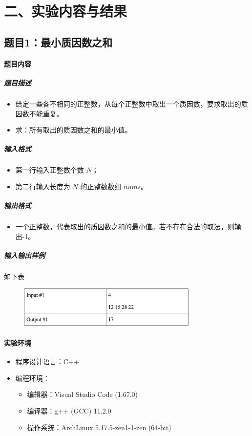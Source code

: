 \documentclass[12pt,a4paper]{ctexart}
\begin{document}
\vspace{5pt}

\section*{二、实验内容与结果}
\subsection*{题目1：最小质因数之和}
\paragraph{题目内容}
\subparagraph{题目描述}
\begin{itemize}
    \item 给定一些各不相同的正整数，从每个正整数中取出一个质因数，要求取出的质因数不能重复。
    \item 求：所有取出的质因数之和的最小值。
\end{itemize}


\subparagraph{输入格式}
    \begin{itemize}
        \item 第一行输入正整数个数 $N$；
        \item 第二行输入长度为 $N$ 的正整数数组 $nums$。
    \end{itemize}
\subparagraph{输出格式}
    \begin{itemize}
        \item 一个正整数，代表取出的质因数之和的最小值。若不存在合法的取法，则输出-1。
    \end{itemize}

\subparagraph{输入输出样例}
如下表
    \begin{figure}[h]
        \centering
        \includegraphics[width=0.80\textwidth]{q1_iodata.png}
    \end{figure}

\vspace{5pt}

\paragraph{实验环境}
\begin{itemize}
    \item 程序设计语言：C++
    \item 编程环境：
    \begin{itemize}
        \item 编辑器：Visual Studio Code (1.67.0)
        \item 编译器：g++ (GCC) 11.2.0
        \item 操作系统：ArchLinux 5.17.5-zen1-1-zen (64-bit)
    \end{itemize}
\end{itemize}
\end{document}
